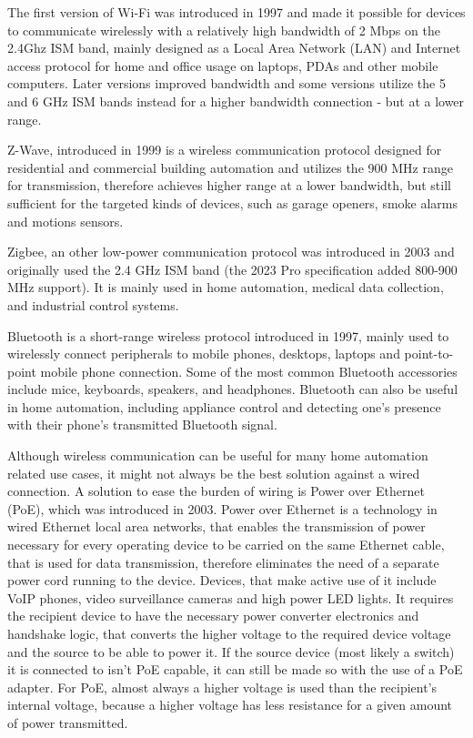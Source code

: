 The first version of Wi-Fi was introduced in 1997 and made it possible for devices to communicate wirelessly with a relatively high bandwidth of 2 Mbps on the 2.4Ghz ISM band, mainly designed as a Local Area Network (LAN) and Internet access protocol for home and office usage on laptops, PDAs and other mobile computers. Later versions improved bandwidth and some versions utilize the 5 and 6 GHz ISM bands instead for a higher bandwidth connection - but at a lower range. \cite{IEEEWiFi}

Z-Wave, introduced in 1999 is a wireless communication protocol designed for residential and commercial building automation and utilizes the 900 MHz range for transmission, therefore achieves higher range at a lower bandwidth, but still sufficient for the targeted kinds of devices, such as garage openers, smoke alarms and motions sensors. \cite{PCMagZWave}

Zigbee, an other low-power communication protocol was introduced in 2003 and originally used the 2.4 GHz ISM band (the 2023 Pro specification added 800-900 MHz support). It is mainly used in home automation, medical data collection, and industrial control systems. \cite{DigiZigbee}

Bluetooth is a short-range wireless protocol introduced in 1997, mainly used to wirelessly connect peripherals to mobile phones, desktops, laptops and point-to-point mobile phone connection. \cite{IntelBluetooth} Some of the most common Bluetooth accessories include mice, keyboards, speakers, and headphones. Bluetooth can also be useful in home automation, including appliance control and detecting one's presence with their phone's transmitted Bluetooth signal.

Although wireless communication can be useful for many home automation related use cases, it might not always be the best solution against a wired connection. A solution to ease the burden of wiring is Power over Ethernet (PoE), which was introduced in 2003. \cite{TTPoE} Power over Ethernet is a technology in wired Ethernet local area networks, that enables the transmission of power necessary for every operating device to be carried on the same Ethernet cable, that is used for data transmission, therefore eliminates the need of a separate power cord running to the device. Devices, that make active use of it include VoIP phones, video surveillance cameras and high power LED lights. It requires the recipient device to have the necessary power converter electronics and handshake logic, that converts the higher voltage to the required device voltage and the source to be able to power it. If the source device (most likely a switch) it is connected to isn't PoE capable, it can still be made so with the use of a PoE adapter. For PoE, almost always a higher voltage is used than the recipient's internal voltage, because a higher voltage has less resistance for a given amount of power transmitted.

